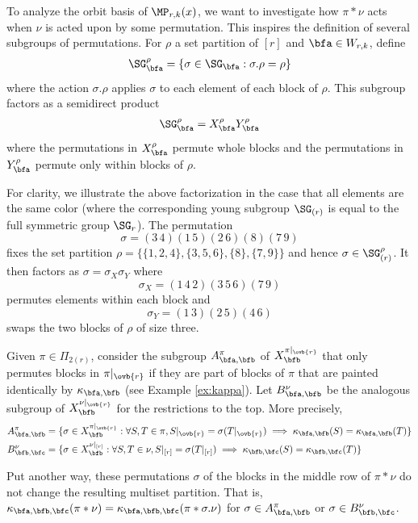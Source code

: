 To analyze the orbit basis of $\MP_{r,k}(x)$, we want to investigate how $\pi\ast\nu$ acts when $\nu$ is acted upon by some permutation. This inspires the definition of several subgroups of permutations. For $\rho$ a set partition of $[r]$ and $\bfa\in W_{r,k}$, define \begin{align*}
    \SG_\bfa^\rho=\{\sigma\in\SG_\bfa:\sigma.\rho=\rho\}
\end{align*} where the action $\sigma.\rho$ applies $\sigma$ to each element of each block of $\rho$. This subgroup factors as a semidirect product \begin{align*}
    \SG_\bfa^\rho=X_\bfa^\rho Y_\bfa^\rho
\end{align*} where the permutations in $X_\bfa^\rho$ permute whole blocks and the permutations in $Y_\bfa^\rho$ permute only within blocks of $\rho$.

\begin{exam} For clarity, we illustrate the above factorization in the case that all elements are the same color (where the corresponding young subgroup $\SG_{(r)}$ is equal to the full symmetric group $\SG_r$). The permutation \[\sigma=(3\,4)(1\,5)(2\,6)(8)(7\,9)\] fixes the set partition $\rho=\{\{1,2,4\},\{3,5,6\},\{8\},\{7,9\}\}$ and hence $\sigma\in \SG_{(r)}^\rho$. It then factors as $\sigma=\sigma_X\sigma_Y$ where \[\sigma_X=(1\,4\,2)(3\,5\,6)(7\,9)\] permutes elements within each block and \[\sigma_Y=(1\,3)(2\,5)(4\,6)\] swaps the two blocks of $\rho$ of size three. 
\end{exam}

Given $\pi\in\Pi_{2(r)}$, consider the subgroup $A_{\bfa,\bfb}^\pi$ of $X_\bfb^{\pi|_{\ovb{r}}}$ that only permutes blocks in $\pi|_{\ovb{r}}$ if they are part of blocks of $\pi$ that are painted identically by $\kappa_{\bfa,\bfb}$ (see Example \ref{ex:kappa}). Let $B_{\bfa,\bfb}^\nu$ be the analogous subgroup of $X_\bfb^{\nu|_{\ovb{r}}}$ for the restrictions to the top. More precisely,
\begin{align*}
    A^\pi_{\bfa,\bfb}&=\{\sigma\in X_\bfb^{\pi|_{\ovb{r}}}:\forall S,T\in\pi, S|_{\ovb{r}}=\sigma(T|_{\ovb{r}})\implies \kappa_{\bfa,\bfb}(S)=\kappa_{\bfa,\bfb}(T)\}\\
    B^\nu_{\bfb,\bfc}&=\{\sigma\in X_\bfb^{\nu|_{[r]}}:\forall S,T\in\nu, S|_{[r]}=\sigma(T|_{[r]})\implies \kappa_{\bfb,\bfc}(S)=\kappa_{\bfb,\bfc}(T)\}
\end{align*}

Put another way, these permutations $\sigma$ of the blocks in the middle row of $\pi\ast\nu$ do not change the resulting multiset partition. That is, $\kappa_{\bfa,\bfb,\bfc}(\pi\ast\nu)=\kappa_{\bfa,\bfb,\bfc}(\pi\ast\sigma.\nu)$ for $\sigma\in A_{\bfa,\bfb}^\pi$ or $\sigma\in B_{\bfb,\bfc}^\nu$.

